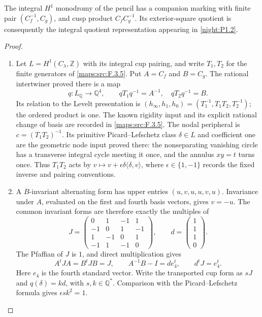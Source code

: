 \begin{theorem}\hypertarget{tag-02QY}{}\label{night:P1.7}
The integral $H^1$ monodromy of the pencil has a companion marking with
finite pair $(C_f^{-1},C_g)$, and cusp product $C_fC_g^{-1}$.
Its exterior-square quotient is consequently the integral quotient
representation appearing in \cref{night:P1.2}.
\end{theorem}
\begin{proof}
\begin{enumerate}[label={$\langle1\rangle$\arabic*.}]
\item Let $L=H^1(C_\lambda,\mathbb Z)$ with its integral cup pairing,
and write $T_1,T_2$ for the finite generators of
\cref{maps:src:F.3.5}. Put $A=C_f$ and $B=C_g$.
The rational intertwiner proved there is a map
\[
 q:L_{\mathbb Q}\longrightarrow\mathbb Q^4,
 \qquad qT_1q^{-1}=A^{-1},\quad qT_2q^{-1}=B.
\]
Its relation to the Levelt presentation is
$(h_\infty,h_1,h_0)=(T_1^{-1},T_1T_2,T_2^{-1})$;
the ordered product is one. The known rigidity input and its explicit
rational change of basis are recorded in \cref{maps:src:F.3.5}.
The nodal peripheral is $c=(T_1T_2)^{-1}$. Its primitive
Picard--Lefschetz class $\delta\in L$ and coefficient one are the
geometric node input proved there: the nonseparating vanishing circle
has a transverse integral cycle meeting it once, and the annulus
$xy=t$ turns once. Thus $T_1T_2$ acts by
$v\mapsto v+\epsilon\delta\langle\delta,v\rangle$,
where $\epsilon\in\{1,-1\}$ records the fixed inverse and pairing
conventions.

\item A $B$-invariant alternating form has upper entries
$(u,v,u,u,v,u)$. Invariance under $A$, evaluated on the first and
fourth basis vectors, gives $v=-u$. The common invariant forms are
therefore exactly the multiples of
\[
 J=\begin{pmatrix}
 0&1&-1&1\\-1&0&1&-1\\1&-1&0&1\\-1&1&-1&0
 \end{pmatrix},\qquad
 d=\begin{pmatrix}1\\1\\1\\0\end{pmatrix}.
\]
The Pfaffian of $J$ is $1$, and direct multiplication gives
\[
 A^tJA=B^tJB=J,\qquad
 A^{-1}B-I=d e_4^t,\qquad d^tJ=e_4^t.
\]
Here $e_4$ is the fourth standard vector. Write the transported cup
form as $sJ$ and $q(\delta)=k d$, with $s,k\in\mathbb Q^*$.
Comparison with the Picard--Lefschetz formula gives
$\epsilon s k^2=1$.


\end{enumerate}
\end{proof}
